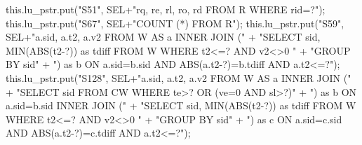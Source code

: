\documentclass{article}
\def\nwendcode{\endtrivlist \endgroup}      %
\theoremstyle{definition}                   %
\begin{document}
this.lu_pstr.put("S51", SEL+"rq, re, rl, ro, rd FROM R WHERE rid=?");
\eatline
{}\nwendcode{}\endmoddef{}
this.lu_pstr.put("S67", SEL+"COUNT (*) FROM R");
\eatline
{}\nwendcode{}\endmoddef{}
this.lu_pstr.put("S59", SEL+"a.sid, a.t2, a.v2 FROM W AS a INNER JOIN ("
      + "SELECT sid, MIN(ABS(t2-?)) as tdiff FROM W WHERE t2<=? AND v2<>0 "
      + "GROUP BY sid"
      + ") as b ON a.sid=b.sid AND ABS(a.t2-?)=b.tdiff AND a.t2<=?");
\eatline
{}\nwendcode{}\endmoddef{}
this.lu_pstr.put("S128", SEL+"a.sid, a.t2, a.v2 FROM W AS a INNER JOIN ("
      + "SELECT sid FROM CW WHERE te>? OR (ve=0 AND sl>?)"
      + ") as b ON a.sid=b.sid INNER JOIN ("
      + "SELECT sid, MIN(ABS(t2-?)) as tdiff FROM W WHERE t2<=? AND v2<>0 "
      + "GROUP BY sid"
      + ") as c ON a.sid=c.sid AND ABS(a.t2-?)=c.tdiff AND a.t2<=?");
\eatline
{}\nwendcode{}\endmoddef{}
\end{document}
